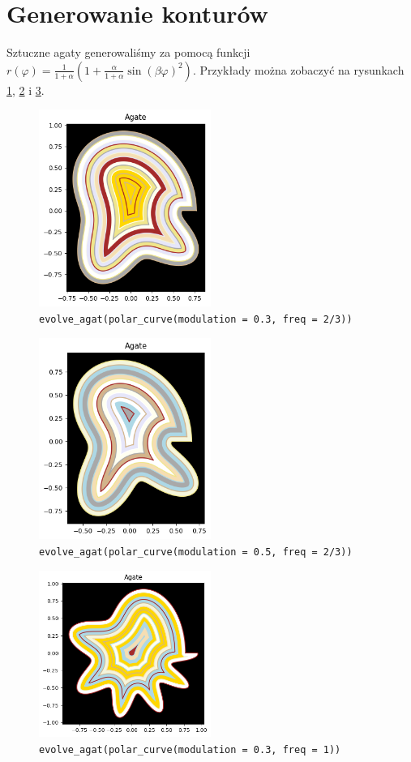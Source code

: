\documentclass{article}
\begin{document}
\section{Generowanie konturów}
Sztuczne agaty generowaliśmy za pomocą funkcji $r(\varphi)=\frac{1}{1+\alpha} (1 + \frac{\alpha}{1+\alpha}\sin(\beta\varphi)^2)$. Przykłady można zobaczyć na rysunkach \ref{wygenerowany1}, \ref{wygenerowany2} i \ref{wygenerowany3}.
\begin{figure}[H]
\caption{\texttt{evolve\_agat(polar\_curve(modulation = 0.3, freq = 2/3))}}
\label{wygenerowany1}
\centering
\includegraphics[width=0.5\textwidth]{obrazy/wygenerowany1.png}
\end{figure}
\begin{figure}[H]
\caption{\texttt{evolve\_agat(polar\_curve(modulation = 0.5, freq = 2/3))}}
\label{wygenerowany2}
\centering
\includegraphics[width=0.5\textwidth]{obrazy/wygenerowany2.png}
\end{figure}
\begin{figure}[H]
\caption{\texttt{evolve\_agat(polar\_curve(modulation = 0.3, freq = 1))}}
\label{wygenerowany3}
\centering
\includegraphics[width=0.5\textwidth]{obrazy/wygenerowany3.png}
\end{figure}
\end{document}
